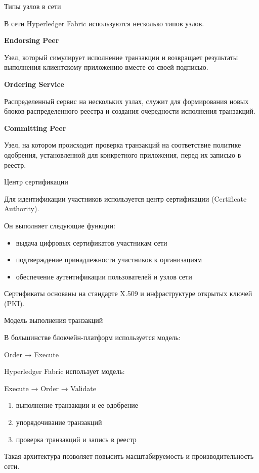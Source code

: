 \documentclass[aspectratio=169]{beamer}
\begin{document}
\begin{frame}{Типы узлов в сети}

В сети Hyperledger Fabric используются несколько типов узлов.

\textbf{Endorsing Peer}

Узел, который симулирует исполнение транзакции и возвращает результаты выполнения клиентскому приложению вместе со своей подписью.

\textbf{Ordering Service}

Распределенный сервис на нескольких узлах, служит для формирования новых блоков распределенного реестра и создания очередности исполнения транзакций.

\textbf{Committing Peer}

Узел, на котором происходит проверка транзакций на соответствие политике одобрения, установленной для конкретного приложения, перед их записью в реестр.

\end{frame}


\begin{frame}{Центр сертификации}

Для идентификации участников используется центр сертификации (Certificate Authority).

Он выполняет следующие функции:

\begin{itemize}
\item выдача цифровых сертификатов участникам сети
\item подтверждение принадлежности участников к организациям
\item обеспечение аутентификации пользователей и узлов сети
\end{itemize}

Сертификаты основаны на стандарте X.509 и инфраструктуре открытых ключей (PKI).

\end{frame}


\begin{frame}{Модель выполнения транзакций}

В большинстве блокчейн-платформ используется модель:

Order → Execute

Hyperledger Fabric использует модель:

Execute → Order → Validate

\begin{enumerate}
\item выполнение транзакции и ее одобрение
\item упорядочивание транзакций
\item проверка транзакций и запись в реестр
\end{enumerate}

Такая архитектура позволяет повысить масштабируемость и производительность сети.

\end{frame}
\end{document}
